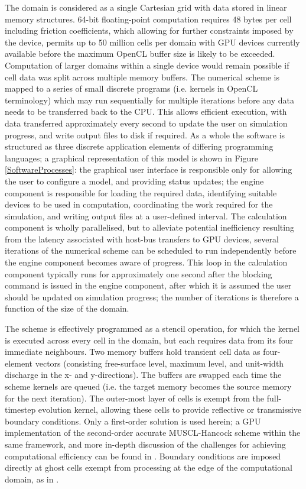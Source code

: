 \documentclass[11pt,english,a4paper]{article}
\begin{document}
The domain is considered as a single Cartesian grid with data stored in linear memory structures. 64-bit floating-point computation requires 48 bytes per cell including friction coefficients, which allowing for further constraints imposed by the device, permits up to 50 million cells per domain with GPU devices currently available before the maximum OpenCL buffer size is likely to be exceeded. Computation of larger domains within a single device would remain possible if cell data was split across multiple memory buffers. The numerical scheme is mapped to a series of small discrete programs (i.e. kernels in OpenCL terminology) which may run sequentially for multiple iterations before any data needs to be transferred back to the CPU. This allows efficient execution, with data transferred approximately every second to update the user on simulation progress, and write output files to disk if required. As a whole the software is structured as three discrete application elements of differing programming languages; a graphical representation of this model is shown in Figure \ref{SoftwareProcesses}: the graphical user interface is responsible only for allowing the user to configure a model, and providing status updates; the engine component is responsible for loading the required data, identifying suitable devices to be used in computation, coordinating the work required for the simulation, and writing output files at a user-defined interval. The calculation component is wholly parallelised, but to alleviate potential inefficiency resulting from the latency associated with host-bus transfers to GPU devices, several iterations of the numerical scheme can be scheduled to run independently before the engine component becomes aware of progress. This loop in the calculation component typically runs for approximately one second after the blocking command is issued in the engine component, after which it is assumed the user should be updated on simulation progress; the number of iterations is therefore a function of the size of the domain.

The scheme is effectively programmed as a stencil operation, for which the kernel is executed across every cell in the domain, but each requires data from its four immediate neighbours. Two memory buffers hold transient cell data as four-element vectors (consisting free-surface level, maximum level, and unit-width discharge in the x- and y-directions). The buffers are swapped each time the scheme kernels are queued (i.e. the target memory becomes the source memory for the next iteration). The outer-most layer of cells is exempt from the full-timestep evolution kernel, allowing these cells to provide reflective or transmissive boundary conditions. Only a first-order solution is used herein; a GPU implementation of the second-order accurate MUSCL-Hancock scheme within the same framework, and more in-depth discussion of the challenges for achieving computational efficiency can be found in \citet{Smith2013}. Boundary conditions are imposed directly at ghost cells exempt from processing at the edge of the computational domain, as in \citet{Liang2010b}.
\end{document}
